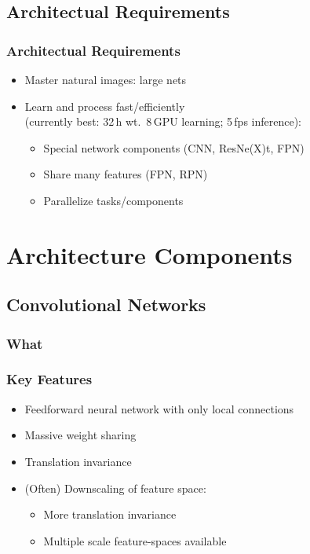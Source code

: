 \subsection{Architectual Requirements}
\begin{frame}[<+->]
  \frametitle<presentation>{Architectual Requirements}
  \begin{itemize}
  \item Master natural images: large nets
  \item Learn and process fast/efficiently\\
    (currently best: 32\,h wt.\ 8\,GPU learning; 5\,fps inference):
    \begin{itemize}
    \item Special network components
      (CNN, ResNe(X)t, FPN)
    \item Share many features (FPN, RPN)
    \item Parallelize tasks/components
    \end{itemize}
  \end{itemize}
\end{frame}

\section{Architecture Components}
\subsection{Convolutional Networks}
\begin{frame}[<+->]
  \frametitle<presentation>{What}
  \frametitle<article>{Key Features}
  \begin{itemize}
  \item Feedforward neural network with only local connections
  \item Massive weight sharing
  \item Translation invariance
  \item (Often) Downscaling of feature space:
    \begin{itemize}
    \item More translation invariance
    \item Multiple scale feature-spaces available
    \end{itemize}
  \end{itemize}
\end{frame}

